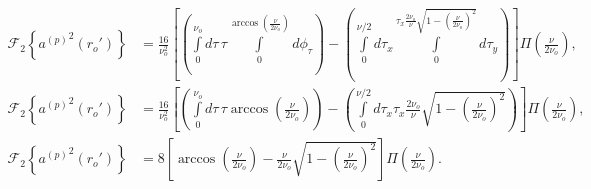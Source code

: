 \documentclass[11pt]{article}
\begin{document}
\begin{align}
  \mathcal{F}_2\left\{{a^{(p)}}^2(r_o')\right\}&= \frac{16}{\nu_o^2}\left[\left(\int\limits_0^{\nu_o} d\tau\, \tau\int\limits_0^{\arccos\left(\frac{\nu}{2\nu_o}\right)}d\phi_{\tau}\right) - \left(\int\limits_0^{\nu/2}d\tau_x \int\limits_0^{\tau_x\frac{2\nu_o}{\nu}\sqrt{1 - \left(\frac{\nu}{2\nu_o}\right)^2}}d\tau_y\right)\right]\Pi\left(\frac{\nu}{2\nu_o}\right),\\
  \mathcal{F}_2\left\{{a^{(p)}}^2(r_o')\right\} &= \frac{16}{\nu_o^2}\left[\left(\int\limits_0^{\nu_o} d\tau\,\tau\arccos\left(\frac{\nu}{2\nu_o}\right)\right) - \left(\int\limits_0^{\nu/2}d\tau_x \tau_x \frac{2\nu_o}{\nu}\sqrt{1 - \left(\frac{\nu}{2\nu_o}\right)^2}\right)\right]\Pi\left(\frac{\nu}{2\nu_o}\right),\\
  \mathcal{F}_2\left\{{a^{(p)}}^2(r_o')\right\} &= 8\left[\arccos\left(\frac{\nu}{2\nu_o}\right) - \frac{\nu}{2\nu_o}\sqrt{1 - \left(\frac{\nu}{2\nu_o}\right)^2}\right]\Pi\left(\frac{\nu}{2\nu_o}\right).
\end{align}
\end{document}
